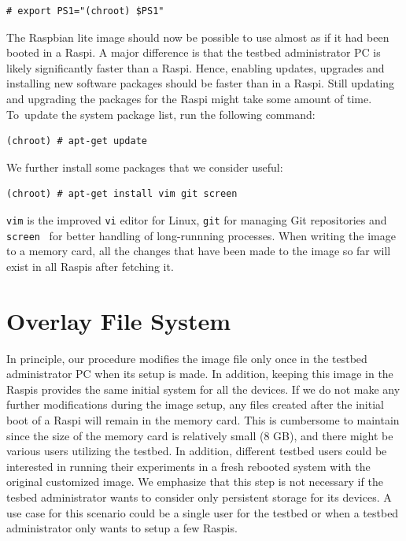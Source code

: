 \documentclass[electronics,article,accept,moreauthors,pdftex,10pt,a4paper]{mdpi}
\theoremstyle{mdpi}
\newcounter{ex}
\newcounter{re}
\theoremstyle{mdpidefinition}
\begin{document}
\begin{lstlisting}[]
# export PS1="(chroot) $PS1"
\end{lstlisting}
\FloatBarrier
\vspace{-5mm}

The Raspbian lite image should now be possible to use almost as if it had
been booted in a Raspi. A major difference is that the testbed
administrator PC is likely significantly faster than a Raspi.
Hence, enabling updates, upgrades and installing new software packages
should be faster than in a Raspi. Still updating and upgrading
the packages for the Raspi might take some amount of time.
To~update the system package list, run the following command:

\begin{lstlisting}[]
(chroot) # apt-get update
\end{lstlisting}
\FloatBarrier
\vspace{-5mm}

We further install some packages that we consider useful:
\begin{lstlisting}[]
(chroot) # apt-get install vim git screen
\end{lstlisting}
\FloatBarrier
\vspace{-5mm}

\texttt{vim} is the improved \texttt{vi} editor for Linux, \texttt{git}
for managing Git repositories and \texttt{screen}~\cite{gnu_screen} for better handling of
long-runnning processes. When writing the image to a memory card, all the
changes that have been made to the image so far will exist in all
Raspis after fetching it.


\section{Overlay File System}
%

\label{sec:overlay_fs}
In principle, our procedure modifies the image file only once in
the testbed administrator PC when its setup is made. In addition, keeping
this image in the Raspis provides the same initial system for all
the devices. If we do not make any further modifications during
the image setup, any files created after the initial boot of a Raspi
will remain in the memory card. This is cumbersome to maintain since
the size of the memory card is relatively small (8 GB), and there
might be various users utilizing the testbed. In addition, different testbed
users could be interested in running their experiments in a fresh
rebooted system with the original customized image. We
emphasize that this step is not necessary if the tesbed administrator
wants to consider only persistent storage for its devices. A use case
for this scenario could be a single user for the testbed or when a testbed
administrator only wants to setup a few Raspis.
\end{document}
